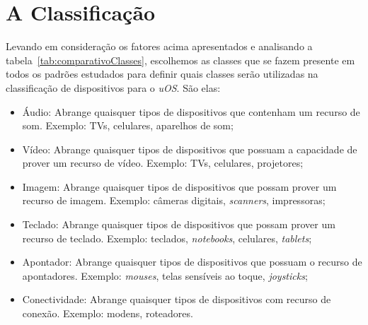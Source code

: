 \section{A Classificação}
Levando em consideração os fatores acima apresentados e analisando a tabela~\ref{tab:comparativoClasses}, escolhemos as classes que se fazem presente em todos os padrões estudados para definir quais classes serão utilizadas na classificação de dispositivos para o \emph{uOS}. São elas:

\begin{itemize}
	\item Áudio:
		Abrange quaisquer tipos de dispositivos que contenham um recurso de som. Exemplo: TVs, celulares, aparelhos de som;
	\item Vídeo:
		Abrange quaisquer tipos de dispositivos que possuam a capacidade de prover um recurso de vídeo. Exemplo: TVs, celulares, projetores;
	\item Imagem:
		Abrange quaisquer tipos de dispositivos que possam prover um recurso de imagem. Exemplo: câmeras digitais, \emph{scanners}, impressoras;
	\item Teclado:
		Abrange quaisquer tipos de dispositivos que possam prover um recurso de teclado. Exemplo: teclados, \emph{notebooks}, celulares, \emph{tablets};
	\item Apontador:
		Abrange quaisquer tipos de dispositivos que possuam o recurso de apontadores. Exemplo: \emph{mouses}, telas sensíveis ao toque, \emph{joysticks};
	\item Conectividade:
		Abrange quaisquer tipos de dispositivos com recurso de conexão. Exemplo: modens, roteadores.
\end{itemize}



